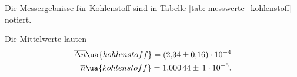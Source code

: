 Die Messergebnisse für Kohlenstoff sind in Tabelle \ref{tab: messwerte_kohlenstoff} notiert.



Die Mittelwerte lauten %
\begin{align}
  \label{eq:mittelwerte_kohlenstoff}
  \begin{aligned}
    \overline{\Delta n}\ua{kohlenstoff}=\num{2.34\pm 0.16 e-4}\\
    \overline{n}\ua{kohlenstoff}=\num{1.00044} \pm\,\num{1e-5}.
  \end{aligned}
\end{align}
